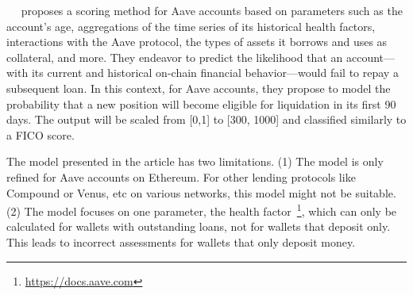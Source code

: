 \documentclass[../ICIT-Paper-2024.tex]{subfiles}
\begin{document}
~\citeauthor{wolf2022scoring}~\cite{wolf2022scoring} proposes a scoring method for Aave accounts based on parameters such as the account’s age, aggregations of the time series of its historical health factors, interactions with the Aave protocol, the types of assets it borrows and uses as collateral, and more. They endeavor to predict the likelihood that an account—with its current and historical on-chain financial behavior—would fail to repay a subsequent loan. In this context, for Aave accounts, they propose to model the probability that a new position will become eligible for liquidation in its first 90 days. The output will be scaled from [0,1] to [300, 1000] and classified similarly to a FICO score.

The model presented in the article has two limitations. (1) The model is only refined for Aave accounts on Ethereum. For other lending protocols like Compound or Venus, etc on various networks, this model might not be suitable. (2) The model focuses on one parameter, the health factor~\footnote{\href{https://docs.aave.com/faq/borrowing\#what-is-the-health-factor}{https://docs.aave.com}}, which can only be calculated for wallets with outstanding loans, not for wallets that deposit only. This leads to incorrect assessments for wallets that only deposit money.
\end{document}
